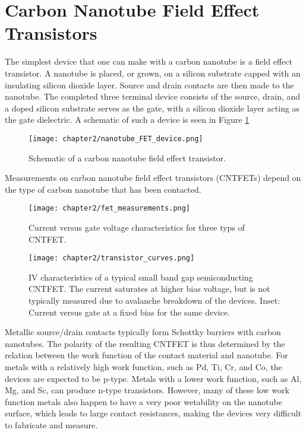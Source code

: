 \section{Carbon Nanotube Field Effect Transistors}

The simplest device that one can make with a carbon nanotube is a field effect transistor. A nanotube is placed, or grown, on a silicon substrate capped with an insulating silicon dioxide layer. Source and drain contacts are then made to the nanotube. The completed three terminal device consists of the source, drain, and a doped silicon substrate serves as the gate, with a silicon dioxide layer acting as the gate dielectric. A schematic of such a device is seen in Figure \ref{fig:nanotube_fet}

\begin{figure}
    \centering
    \texttt{[image: chapter2/nanotube\_FET\_device.png]}
    \caption{Schematic of a carbon nanotube field effect transistor.}
    \label{fig:nanotube_fet}
\end{figure}

Measurements on carbon nanotube field effect transistors (CNTFETs) depend on the type of carbon nanotube that has been contacted.

\begin{figure}
    \centering
    \texttt{[image: chapter2/fet\_measurements.png]}
    \caption{Current versus gate voltage characteristics for three typs of CNTFET.}
    \label{fig:fet_measurements}
\end{figure}

\begin{figure}
    \centering
    \texttt{[image: chapter2/transistor\_curves.png]}
    \caption{IV characteristics of a typical small band gap semiconducting CNTFET. The current saturates at higher bias voltage, but is not typically measured due to avalanche breakdown of the devices. Inset: Current versus gate at a fixed bias for the same device.}
    \label{transistor_curves.png}
\end{figure}

Metallic source/drain contacts typically form Schottky barriers with carbon nanotubes. The polarity of the resulting CNTFET is thus determined by the relation between the work function of the contact material and nanotube. For metals with a relatively high work function, such as Pd, Ti, Cr, and Co, the devices are expected to be p-type. Metals with a lower work function, such as Al, Mg, and Sc, can produce n-type transistors. However, many of these low work function metals also happen to have a very poor wetability on the nanotube surface, which leads to large contact resistances, making the devices very difficult to fabricate and measure.

